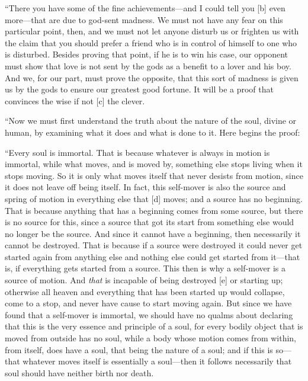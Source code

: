 “There you have some of the fine achievements---and I could tell you
{[}b{]} even more---that are due to god-sent madness. We must not have
any fear on this particular point, then, and we must not let anyone
disturb us or frighten us with the claim that you should prefer a friend
who is in control of himself to one who is disturbed. Besides proving
that point, if he is to win his case, our opponent must show that love
is not sent by the gods as a benefit to a lover and his boy. And we, for
our part, must prove the opposite, that this sort of madness is given us
by the gods to ensure our greatest good fortune. It will be a proof that
convinces the wise if not {[}c{]} the clever.

“Now we must first understand the truth about the nature of the soul,
divine or human, by examining what it does and what is done to it. Here
begins the proof:

“Every soul is
immortal. That is because whatever is always in motion is immortal,
while what moves, and is moved by, something else stops living when it
stops moving. So it is only what moves itself that never desists from
motion, since it does not leave off being itself. In fact, this
self-mover is also the source and spring of motion in everything else
that {[}d{]} moves; and a source has no beginning. That is because
anything that has a beginning comes from some source, but there is no
source for this, since a source that got its start from something else
would no longer be the source. And since it cannot have a beginning,
then necessarily it cannot be destroyed. That is because if a source
were destroyed it could never get started again from anything else and
nothing else could get started from it---that is, if everything gets
started from a source. This then is why a self-mover is a source of
motion. And {\em that} is incapable of being destroyed {[}e{]} or
starting up; otherwise all heaven and everything that has been started
up would collapse,
come to a stop, and never have cause to start moving again. But since we
have found that a self-mover is immortal, we should have no qualms about
declaring that this is the very essence and principle of a soul, for
every bodily object that is moved from outside has no soul, while a body
whose motion comes from within, from itself, does have a soul, that
being the nature of a soul; and if this is so---that whatever moves
itself is essentially a soul---then it follows necessarily that soul
should have neither birth nor death.

